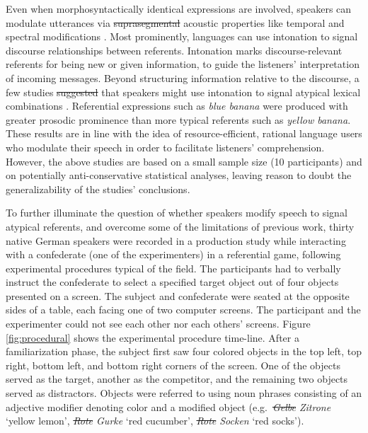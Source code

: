 \documentclass[Review,times,sageh]{sagej}
\providecommand{\DIFaddtex}[1]{{\protect\color{blue}\uwave{#1}}} %
\providecommand{\DIFdeltex}[1]{{\protect\color{red}\sout{#1}}}                      %
\providecommand{\DIFaddbegin}{} %
\providecommand{\DIFaddend}{} %
\providecommand{\DIFdelbegin}{} %
\providecommand{\DIFdelend}{} %
\providecommand{\DIFadd}[1]{\texorpdfstring{\DIFaddtex{#1}}{#1}} %
\providecommand{\DIFdel}[1]{\texorpdfstring{\DIFdeltex{#1}}{}} %
\begin{document}
Even when morphosyntactically identical expressions are involved, speakers can modulate utterances via \DIFdelbegin \DIFdel{suprasegmental }\DIFdelend acoustic properties like temporal and spectral modifications \citep[e.g.,][]{ladd2008intonational}.
Most prominently, languages can use intonation to signal discourse relationships between referents.
Intonation marks discourse-relevant referents for being new or given information, to guide the listeners' interpretation of incoming messages.
Beyond structuring information relative to the discourse, a few studies \DIFdelbegin \DIFdel{suggested }\DIFdelend \DIFaddbegin \DIFadd{suggest }\DIFaddend that speakers might use intonation to signal atypical lexical combinations \citep[e.g.][]{dimitrova2008prosodic, dimitrova2009did}.
Referential expressions such as \emph{blue banana} were produced with greater prosodic prominence than more typical referents such as \emph{yellow banana}.
These results are in line with the idea of resource-efficient, rational language users who modulate their speech in order to facilitate listeners' comprehension.
However, the above studies are based on a small sample size (10 participants) and on potentially anti-conservative statistical analyses, leaving reason to doubt the generalizability of the studies' conclusions.

To further illuminate the question of whether speakers modify speech to signal atypical referents, and overcome some of the limitations of previous work, thirty native German speakers were recorded in a production study while interacting with a confederate (one of the experimenters) in a referential game, following experimental procedures typical of the field.
The participants had to verbally instruct the confederate to select a specified target object out of four objects presented on a screen.
The subject and confederate were seated at the opposite sides of a table, each facing one of two computer screens.
The participant and the experimenter could not see each other nor each others' screens.
Figure \ref{fig:procedural} shows the experimental procedure time-line.
After a familiarization phase, the subject first saw four colored objects in the top left, top right, bottom left, and bottom right corners of the screen.
One of the objects served as the target, another as the competitor, and the remaining two objects served as distractors.
Objects were referred to using noun phrases consisting of an adjective modifier denoting color and a modified object (e.g.~\emph{\DIFdelbegin \DIFdel{Gelbe }\DIFdelend \DIFaddbegin \DIFadd{gelbe }\DIFaddend Zitrone} `yellow lemon', \emph{\DIFdelbegin \DIFdel{Rote }\DIFdelend \DIFaddbegin \DIFadd{rote }\DIFaddend Gurke} `red cucumber', \emph{\DIFdelbegin \DIFdel{Rote }\DIFdelend \DIFaddbegin \DIFadd{rote }\DIFaddend Socken} `red socks').
\end{document}
